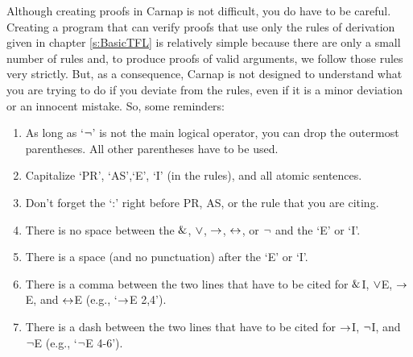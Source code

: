 


Although creating proofs in Carnap is not difficult, you do have to be careful. Creating a program that can verify proofs that use only the rules of derivation given in chapter \ref{s:BasicTFL} is relatively simple because there are only a small number of rules and, to produce proofs of valid arguments, we follow those rules very strictly. But, as a consequence, Carnap is not designed to understand what you are trying to do if you deviate from the rules, even if it is a minor deviation or an innocent mistake. So, some reminders:
\begin{enumerate}
\itemsep-.3mm
	\item As long as `${\neg}$' is not the main logical operator, you can drop the outermost parentheses. All other parentheses have to be used. 
	\item Capitalize `PR', `AS',`E', `I' (in the rules), and all atomic sentences.
	\item Don't forget the `:' right before PR, AS, or the rule that you are citing. 
	\item There is no space between the $\mathbin{\&}$, $\vee$, $\rightarrow$, $\leftrightarrow$, or ${\neg}$ and the `E' or `I'.  
	\item There is a space (and no punctuation) after the `E' or `I'. 
	\item There is a comma between the two lines that have to be cited for $\mathbin{\&}$I, $\vee$E, $\rightarrow$E, and $\leftrightarrow$E (e.g., `$\rightarrow$E 2,4').
	\item There is a dash between the two lines that have to be cited for $\rightarrow$I, ${\neg}$I, and ${\neg}$E (e.g., `${\neg}$E 4-6').
\end{enumerate}


